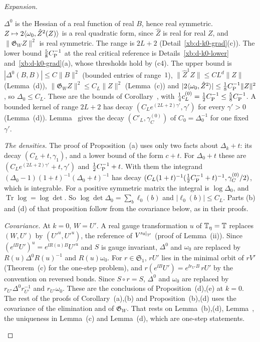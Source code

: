 \begin{proof}[Expansion]
\begin{step}
$\Delta^0$ is the Hessian of a real function of real $B$, hence real symmetric. $Z\mapsto2\langle \omega_0,\hat Z^2(Z)\rangle$ is a real quadratic form, since $\hat Z$ is real for real $Z$, and $\|\mathfrak G_WZ\|^2$ is real symmetric. The range is $2L+2$ (Detail~\ref{xb:d-k0-grad}(c)). The lower bound $\frac58C_{\rm P}^{-1}$ at the real critical reference is Details~\ref{xb:d-k0-lower} and~\ref{xb:d-k0-grad}(a), whose thresholds hold by (c4). The upper bound is $|\Delta^0(B,B)|\le C\|B\|^2$ (bounded entries of range~$1$), $\|\hat Z^1Z\|\le CL^d\|Z\|$ (Lemma~(d)), $\|\mathfrak G_WZ\|^2\le C_L\|Z\|^2$ (Lemma~(c)) and $|2\langle \omega_0,\hat Z^2\rangle|\le\frac18C_{\rm P}^{-1}\|Z\|^2$, so $\Delta_0\le C_L$. These are the bounds of Corollary~, with $\frac14c^{(0)}_L=\frac12C_{\rm P}^{-1}\le\frac58C_{\rm P}^{-1}$. A bounded kernel of range $2L+2$ has decay $(C_Le^{(2L+2)\gamma'},\gamma')$ for every $\gamma'>0$ (Lemma~(d)). Lemma~ gives the decay $(C'_L,\gamma^{(0)}_C)$ of $C_0=\Delta_0^{-1}$ for one fixed $\gamma'$.

\emph{The densities.} The proof of Proposition~(a) uses only two facts about $\Delta_k+t$: its decay $(C_L+t,\gamma_1)$, and a lower bound of the form $c+t$. For $\Delta_0+t$ these are $(C_Le^{(2L+2)\gamma'}+t,\gamma')$ and $\frac12C_{\rm P}^{-1}+t$. With them the integrand $(\Delta_0-1)(1+t)^{-1}(\Delta_0+t)^{-1}$ has decay $(C_L(1+t)^{-1}(\frac12C_{\rm P}^{-1}+t)^{-1},\gamma^{(0)}_C/2)$, which is integrable. For a positive symmetric matrix the integral is $\log\Delta_0$, and $\operatorname{Tr}\log=\log\det$. So $\log\det\Delta_0=\sum_b\ell_0(b)$ and $|\ell_0(b)|\le C_L$. Parts (b) and (d) of that proposition follow from the covariance below, as in their proofs.

\emph{Covariance.} At $k=0$, $W=U'$. A real gauge transformation $u$ of $\mathbb T_\eta=\mathbb T$ replaces $(W,U')$ by $(U'^u,U'^u)$, the reference of $V'^{u|_{\mathbb T'}}$ (proof of Lemma~(ii)). Since $(e^{\ii B}U')^u=e^{\ii R(u)B}U'^u$ and $S$ is gauge invariant, $\Delta^0$ and $\omega_0$ are replaced by $R(u)\Delta^0R(u)^{-1}$ and $R(u)\omega_0$. For $r\in\mathfrak S_1$, $rU'$ lies in the minimal orbit of $rV'$ (Theorem~(c) for the one-step problem), and $r(e^{\ii B}U')=e^{\ii r_{U'}B}\,rU'$ by the convention on reversed bonds. Since $S\circ r=S$, $\Delta^0$ and $\omega_0$ are replaced by $r_{U'}\Delta^0r_{U'}^{-1}$ and $r_{U'}\omega_0$. These are the conclusions of Proposition~(d),(e) at $k=0$. The rest of the proofs of Corollary~(a),(b) and Proposition~(b),(d) uses the covariance of the elimination and of $\mathfrak G_W$. That rests on Lemma~(b),(d), Lemma~, the uniqueness in Lemma~(c) and Lemma~(d), which are one-step statements.
\end{step}


\end{proof}
